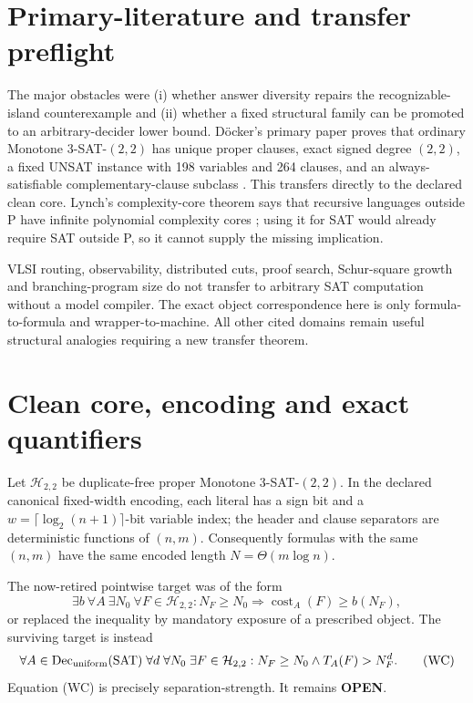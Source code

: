 \documentclass[11pt]{article}
\newcommand{\Htwo}{\mathcal H_{2,2}}
\newcommand{\OPEN}{\textbf{OPEN}}
\begin{document}
\section{Primary-literature and transfer preflight}

The major obstacles were (i) whether answer diversity repairs the
recognizable-island counterexample and (ii) whether a fixed structural family
can be promoted to an arbitrary-decider lower bound.  D\"ocker's primary
paper proves that ordinary Monotone 3-SAT-$(2,2)$ has unique proper clauses,
exact signed degree $(2,2)$, a fixed UNSAT instance with 198 variables and 264
clauses, and an always-satisfiable complementary-clause subclass
\cite{docker}.  This transfers directly to the declared clean core.  Lynch's
complexity-core theorem says that recursive languages outside P have infinite
polynomial complexity cores \cite{lynch}; using it for SAT would already
require SAT outside P, so it cannot supply the missing implication.

VLSI routing, observability, distributed cuts, proof search, Schur-square
growth and branching-program size do not transfer to arbitrary SAT computation
without a model compiler.  The exact object correspondence here is only
formula-to-formula and wrapper-to-machine.  All other cited domains remain
useful structural analogies requiring a new transfer theorem.

\section{Clean core, encoding and exact quantifiers}

Let $\Htwo$ be duplicate-free proper Monotone 3-SAT-$(2,2)$.  In the declared
canonical fixed-width encoding, each literal has a sign bit and a
$w=\lceil\log_2(n+1)\rceil$-bit variable index; the header and clause
separators are deterministic functions of $(n,m)$.  Consequently formulas
with the same $(n,m)$ have the same encoded length $N=\Theta(m\log n)$.

The now-retired pointwise target was of the form
\[
 \exists b\ \forall A\ \exists N_0\ \forall F\in\Htwo:
 N_F\ge N_0\Rightarrow\operatorname{cost}_A(F)\ge b(N_F),
 \tag{PW}
\]
or replaced the inequality by mandatory exposure of a prescribed object.
The surviving target is instead
\[
 \forall A\in\operatorname{Dec}_{\rm uniform}(\mathrm{SAT})\;
 \forall d\;\forall N_0\;\exists F\in\Htwo:
 N_F\ge N_0\land T_A(F)>N_F^d.
 \tag{WC}
\]
Equation (WC) is precisely separation-strength.  It remains \OPEN{}.
\end{document}
